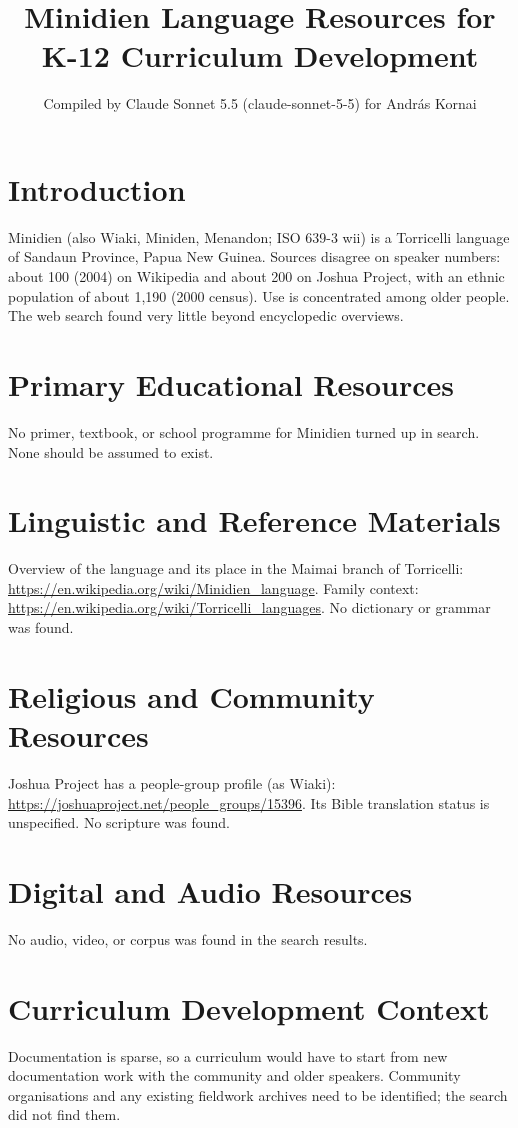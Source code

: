 \documentclass[12pt]{article}
\title{Minidien Language Resources for K-12 Curriculum Development}
\author{Compiled by Claude Sonnet 5.5 (claude-sonnet-5-5) for Andr\'as Kornai}
\date{}
\begin{document}
\maketitle

\section{Introduction}
Minidien (also Wiaki, Miniden, Menandon; ISO 639-3 wii) is a Torricelli language of Sandaun Province, Papua New Guinea. Sources disagree on speaker numbers: about 100 (2004) on Wikipedia and about 200 on Joshua Project, with an ethnic population of about 1{,}190 (2000 census). Use is concentrated among older people. The web search found very little beyond encyclopedic overviews.

\section{Primary Educational Resources}
No primer, textbook, or school programme for Minidien turned up in search. None should be assumed to exist.

\section{Linguistic and Reference Materials}
Overview of the language and its place in the Maimai branch of Torricelli: \url{https://en.wikipedia.org/wiki/Minidien_language}. Family context: \url{https://en.wikipedia.org/wiki/Torricelli_languages}. No dictionary or grammar was found.

\section{Religious and Community Resources}
Joshua Project has a people-group profile (as Wiaki): \url{https://joshuaproject.net/people_groups/15396}. Its Bible translation status is unspecified. No scripture was found.

\section{Digital and Audio Resources}
No audio, video, or corpus was found in the search results.

\section{Curriculum Development Context}
Documentation is sparse, so a curriculum would have to start from new documentation work with the community and older speakers. Community organisations and any existing fieldwork archives need to be identified; the search did not find them.
\end{document}
